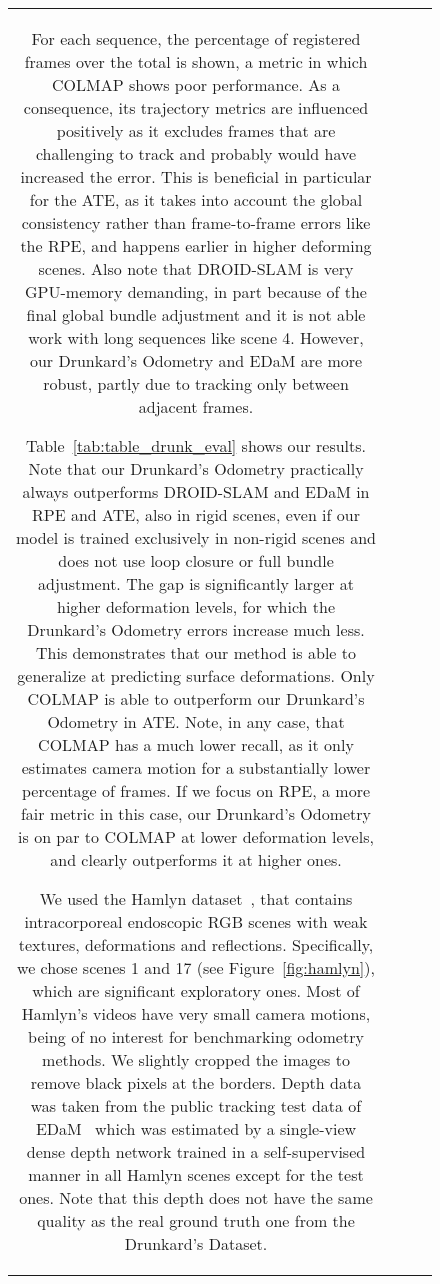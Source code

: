 \documentclass{article}
\newcommand{\boldparagraph}[1]{\vspace{0.0em}\noindent{\bf #1}}
\begin{document}
\begin{figure}
\begin{tabular}{cccc}
For each sequence, the percentage of registered frames over the total is shown, a metric in which COLMAP shows poor performance. As a consequence, its trajectory metrics are influenced positively as it excludes frames that are challenging to track and probably would have increased the error. This is beneficial in particular for the ATE, as it takes into account the global consistency rather than frame-to-frame errors like the RPE, and happens earlier in higher deforming scenes. Also note that DROID-SLAM is very GPU-memory demanding, in part because of the final global bundle adjustment and it is not able work with long sequences like scene 4. However, our Drunkard's Odometry and EDaM are more robust, partly due to tracking only between adjacent frames.

Table~\ref{tab:table_drunk_eval} shows our results. Note that our Drunkard's Odometry practically always outperforms DROID-SLAM and EDaM in RPE and ATE, also in rigid scenes, even if our model is trained exclusively in non-rigid scenes and does not use loop closure or full bundle adjustment. 
The gap is significantly larger at higher deformation levels, for which the Drunkard's Odometry errors increase much less. This demonstrates that our method is able to generalize at predicting surface deformations. Only COLMAP is able to outperform our Drunkard's Odometry in ATE. Note, in any case, that COLMAP has a much lower recall, as it only estimates camera motion for a substantially lower percentage of frames. If we focus on RPE, a more fair metric in this case, our Drunkard's Odometry is on par to COLMAP at lower deformation levels, and clearly outperforms it at higher ones. 

 
\boldparagraph{Validation in real endoscopies.}
We used the Hamlyn dataset~\cite{stoyanov2005soft}, that contains intracorporeal endoscopic RGB scenes with weak textures, deformations and reflections. Specifically, we chose scenes 1 and 17 (see Figure~\ref{fig:hamlyn}), which are significant exploratory ones. Most of Hamlyn's videos have very small camera motions, being of no interest for benchmarking odometry methods. We slightly cropped the images to remove black pixels at the borders. Depth data was taken from the public tracking test data of EDaM~\cite{recasens2021endo} which was estimated by a single-view dense depth network trained in a self-supervised manner in all Hamlyn scenes except for the test ones. Note that this depth does not have the same quality as the real ground truth one from the Drunkard's Dataset. 


\end{tabular}
\end{figure}
\end{document}
